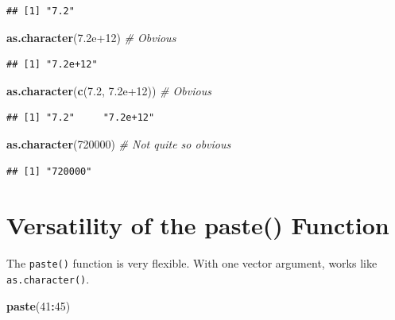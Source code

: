 \documentclass[
]{book}
\newenvironment{Shaded}{\begin{snugshade}}{\end{snugshade}}
\newcommand{\CommentTok}[1]{\textcolor[rgb]{0.56,0.35,0.01}{\textit{#1}}}
\newcommand{\DecValTok}[1]{\textcolor[rgb]{0.00,0.00,0.81}{#1}}
\newcommand{\FloatTok}[1]{\textcolor[rgb]{0.00,0.00,0.81}{#1}}
\newcommand{\KeywordTok}[1]{\textcolor[rgb]{0.13,0.29,0.53}{\textbf{#1}}}
\newcommand{\NormalTok}[1]{#1}
\newcommand{\OperatorTok}[1]{\textcolor[rgb]{0.81,0.36,0.00}{\textbf{#1}}}
\begin{document}
\begin{verbatim}
## [1] "7.2"
\end{verbatim}

\begin{Shaded}
\begin{Highlighting}[]
\KeywordTok{as.character}\NormalTok{(}\FloatTok{7.2e+12}\NormalTok{)  }\CommentTok{# Obvious}
\end{Highlighting}
\end{Shaded}

\begin{verbatim}
## [1] "7.2e+12"
\end{verbatim}

\begin{Shaded}
\begin{Highlighting}[]
\KeywordTok{as.character}\NormalTok{(}\KeywordTok{c}\NormalTok{(}\FloatTok{7.2}\NormalTok{, }\FloatTok{7.2e+12}\NormalTok{))  }\CommentTok{# Obvious}
\end{Highlighting}
\end{Shaded}

\begin{verbatim}
## [1] "7.2"     "7.2e+12"
\end{verbatim}

\begin{Shaded}
\begin{Highlighting}[]
\KeywordTok{as.character}\NormalTok{(}\DecValTok{720000}\NormalTok{)  }\CommentTok{# Not quite so obvious}
\end{Highlighting}
\end{Shaded}

\begin{verbatim}
## [1] "720000"
\end{verbatim}

\hypertarget{versatility-of-the-paste-function}{%
\section{Versatility of the paste() Function}\label{versatility-of-the-paste-function}}

The \texttt{paste()} function is very flexible. With one vector argument, works like \texttt{as.character()}.

\begin{Shaded}
\begin{Highlighting}[]
\KeywordTok{paste}\NormalTok{(}\DecValTok{41}\OperatorTok{:}\DecValTok{45}\NormalTok{)}
\end{Highlighting}
\end{Shaded}
\end{document}
